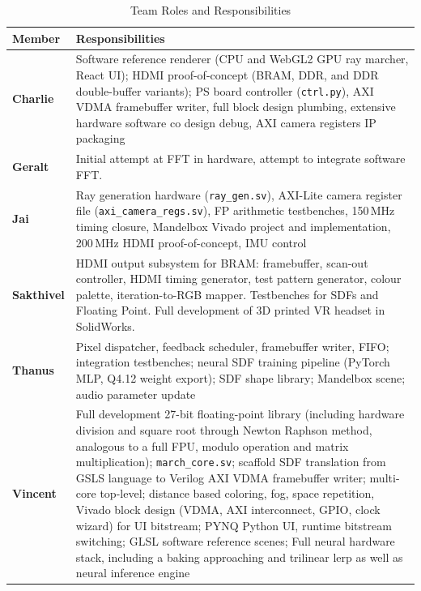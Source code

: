{\renewcommand{\arraystretch}{2.0}
\begin{table}[h!]
\centering
\small
\caption{Team Roles and Responsibilities}
\label{tab:team_roles}
\begin{tabular}{>{\bfseries}l p{10.2cm}}
\toprule
\textbf{Member} & \textbf{Responsibilities} \\
\midrule
Charlie   & Software reference renderer (CPU and WebGL2 GPU ray marcher, React UI);
            HDMI proof-of-concept (BRAM, DDR, and DDR double-buffer variants);
            PS board controller (\texttt{ctrl.py}), AXI VDMA framebuffer writer, full block design plumbing, extensive hardware software co design debug,
            AXI camera registers IP packaging \\
Geralt    & Initial attempt at FFT in hardware, attempt to integrate software FFT. \\
Jai       & Ray generation hardware (\texttt{ray\_gen.sv}),
            AXI-Lite camera register file (\texttt{axi\_camera\_regs.sv}),
            FP arithmetic testbenches, 150\,MHz timing closure,
            Mandelbox Vivado project and implementation, 200\,MHz HDMI proof-of-concept, IMU control\\
Sakthivel & HDMI output subsystem for BRAM: framebuffer, scan-out controller,
            HDMI timing generator, test pattern generator, colour palette, iteration-to-RGB mapper. Testbenches for SDFs and Floating Point.
            Full development of 3D printed VR headset in SolidWorks.
            \\
Thanus    & Pixel dispatcher, feedback scheduler, framebuffer writer,
            FIFO; integration testbenches; neural SDF training pipeline
            (PyTorch MLP, Q4.12 weight export); SDF shape library;
            Mandelbox scene; audio parameter update \\
Vincent   & Full development 27-bit floating-point library (including hardware                     division and square root through Newton Raphson method, analogous to a                full FPU, modulo operation and matrix multiplication);
            \texttt{march\_core.sv}; scaffold SDF translation from GSLS language to Verilog
            AXI VDMA framebuffer writer; multi-core top-level; distance based coloring, fog, space repetition,
            Vivado block design (VDMA, AXI interconnect, GPIO, clock wizard) for UI bitstream;
            PYNQ Python UI, runtime bitstream switching;
            GLSL software reference scenes; 
            Full neural hardware stack, including a baking approaching and trilinear lerp as well as neural inference engine\\
\bottomrule
\end{tabular}
\end{table}
}

